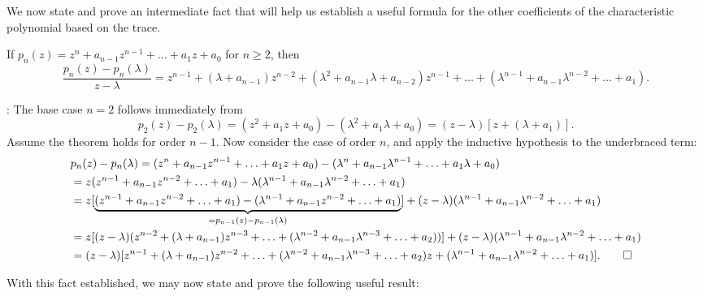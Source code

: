 We now state and prove an intermediate fact that will help us establish a useful formula for the other coefficients of the characteristic polynomial based on the trace.

\begin{fact}\label{fact:pz-plambda/z-lambda} If $p_n(z)=z^n + a_{n-1} z^{n-1} + \ldots + a_{1} z + a_{0}$ for $n\ge 2$, then
\begin{equation*}
  \frac{p_n(z)-p_n(\lambda)}{z-\lambda} = z^{n-1} + (\lambda + a_{n-1}) z^{n-2} + (\lambda^2 + a_{n-1} \lambda + a_{n-2}) z^{n-1} + \ldots + (\lambda^{n-1} + a_{n-1} \lambda^{n-2} + \ldots + a_{1}).
\end{equation*}
\end{fact}

\/: The base case $n=2$ follows immediately from
\begin{equation*}
p_2(z)-p_2(\lambda) = (z^2+a_1 z + a_0) - (\lambda^2+a_1 \lambda + a_0) = (z-\lambda)[z + (\lambda + a_1)].
\end{equation*}
Assume the theorem holds for order $n-1$.  Now consider the case of order $n$, and apply the inductive hypothesis to the underbraced term:
\begin{align}
  & p_n(z) - p_n(\lambda)
    = (z^n + a_{n-1} z^{n-1} + \ldots + a_{1} z + a_{0}) - (\lambda^n + a_{n-1} \lambda^{n-1} + \ldots + a_{1} \lambda + a_{0}) \notag \\
   & = z (z^{n-1} + a_{n-1} z^{n-2} + \ldots + a_{1}) - \lambda (\lambda^{n-1} + a_{n-1} \lambda^{n-2} + \ldots + a_{1}) \notag \\
   & = z [\underbrace{(z^{n-1} + a_{n-1} z^{n-2} + \ldots + a_{1}) - (\lambda^{n-1} + a_{n-1} z^{n-2} + \ldots + a_{1})}_{=p_{n-1}(z) - p_{n-1}(\lambda)}]
   + (z- \lambda) (\lambda^{n-1} + a_{n-1} \lambda^{n-2} + \ldots + a_{1}) \notag \\
   & = z [(z-\lambda)(z^{n-2} + (\lambda + a_{n-1}) z^{n-3} + \ldots +  (\lambda^{n-2} + a_{n-1} \lambda^{n-3} + \ldots + a_{2}))] + (z- \lambda) (\lambda^{n-1} + a_{n-1} \lambda^{n-2} + \ldots + a_{1}) \notag \\
   & = (z-\lambda) [z^{n-1} + (\lambda + a_{n-1}) z^{n-2} + \ldots +  (\lambda^{n-2} + a_{n-1} \lambda^{n-3} + \ldots + a_{2}) z + (\lambda^{n-1} + a_{n-1} \lambda^{n-2} + \ldots + a_{1})].     \tag*{$\Box$}
\end{align}
\clearpage

\noindent With this fact established, we may now state and prove the following useful result:

